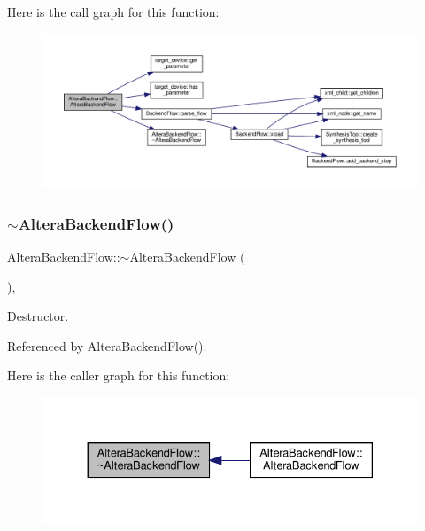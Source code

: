 Here is the call graph for this function\+:
\nopagebreak
\begin{figure}[H]
\begin{center}
\leavevmode
\includegraphics[width=350pt]{d2/d83/classAlteraBackendFlow_aeb3203a30034d5650f1dd14133887224_cgraph}
\end{center}
\end{figure}
\mbox{\label{classAlteraBackendFlow_a5d0a20b521fcadf6e5cd03e9ce876351}} 
\subsubsection{\texorpdfstring{$\sim$\+Altera\+Backend\+Flow()}{~AlteraBackendFlow()}}
{\footnotesize\ttfamily Altera\+Backend\+Flow\+::$\sim$\+Altera\+Backend\+Flow (\begin{DoxyParamCaption}{ }\end{DoxyParamCaption})\hspace{0.3cm}{\ttfamily [override]}, {\ttfamily [default]}}



Destructor. 



Referenced by Altera\+Backend\+Flow().

Here is the caller graph for this function\+:
\nopagebreak
\begin{figure}[H]
\begin{center}
\leavevmode
\includegraphics[width=330pt]{d2/d83/classAlteraBackendFlow_a5d0a20b521fcadf6e5cd03e9ce876351_icgraph}
\end{center}
\end{figure}


